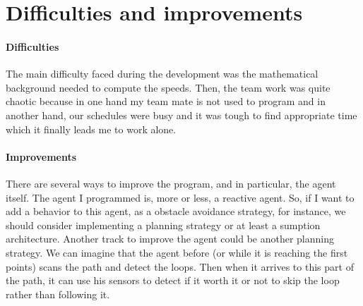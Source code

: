 \section{Difficulties and improvements}

\paragraph{Difficulties}{
    The main difficulty faced during the development was the mathematical
 background needed to compute the speeds. Then, the team work was quite chaotic
 because in one hand my team mate is not used to program and in another hand,
 our schedules were busy and it was tough to find appropriate time which it
 finally leads me to work alone.
}

\paragraph{Improvements}{
    There are several ways to improve the program, and in particular, the
 agent itself. The agent I programmed is, more or less, a reactive agent. So,
 if I want to add a behavior to this agent, as a obstacle avoidance strategy, 
 for instance, we should consider implementing a planning strategy or at least 
 a sumption architecture. \newline
 Another track to improve the agent could be another planning strategy. We can
 imagine that the agent before (or while it is reaching the first points) scans
 the path and detect the loops. Then when it arrives to this part of the path,
 it can use his sensors to detect if it worth it or not to skip the loop rather
 than following it.
}
